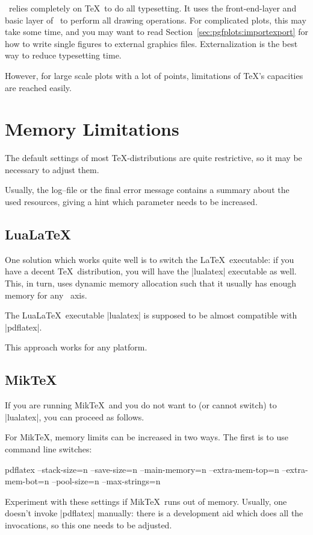 {\PGFPlots\ relies completely on \TeX\ to do all typesetting. It uses the front-end-layer and basic layer of \PGF\ to perform all drawing operations. For complicated plots, this may take some time, and you may want to read Section~\ref{sec:pgfplots:importexport} for how to write single figures to external graphics files. Externalization is the best way to reduce typesetting time.

However, for large scale plots with a lot of points, limitations of \TeX's capacities are reached easily.

\section{Memory Limitations}
The default settings of most \TeX-distributions are quite restrictive, so it may be necessary to adjust them. 

Usually, the log--file or the final error message contains a summary about the used resources, giving a hint which parameter needs to be increased.

\subsection{LuaLa\TeX}
One solution which works quite well is to switch the La\TeX\ executable: if you have a decent \TeX\ distribution, you will have the |lualatex| executable as well. This, in turn, uses dynamic memory allocation such that it usually has enough memory for any \PGFPlots\ axis.

The LuaLa\TeX\ executable |lualatex| is supposed to be almost compatible with |pdflatex|. 

This approach works for any platform.

\subsection{Mik\TeX}
If you are running Mik\TeX\ and you do not want to (or cannot switch) to |lualatex|, you can proceed as follows.

For Mik\TeX, memory limits can be increased in two ways. The first is to use command line switches:
\begin{codeexample}
pdflatex 
	--stack-size=n --save-size=n 
	--main-memory=n --extra-mem-top=n --extra-mem-bot=n
	--pool-size=n --max-strings=n 
\end{codeexample}
\noindent Experiment with these settings if Mik\TeX\ runs out of memory. Usually, one doesn't invoke |pdflatex| manually: there is a development aid which does all the invocations, so this one needs to be adjusted. 

}

